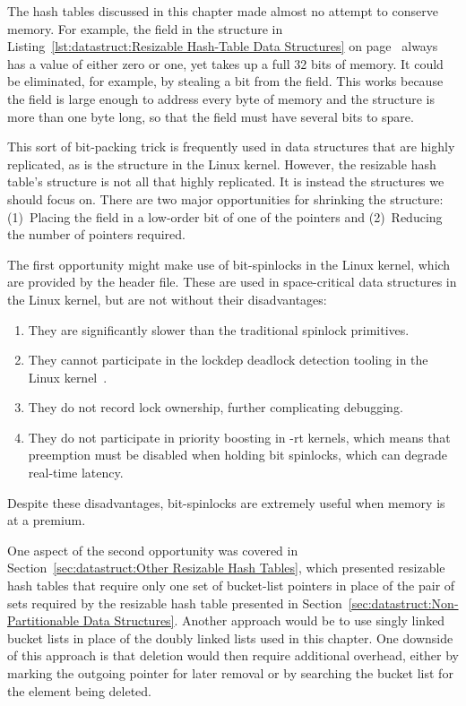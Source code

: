 The hash tables discussed in this chapter made almost no attempt to conserve
memory.
For example, the  field in the  structure in
Listing~\ref{lst:datastruct:Resizable Hash-Table Data Structures} on
page~\pageref{lst:datastruct:Resizable Hash-Table Data Structures}
always has a value of either zero or one, yet takes up a full 32 bits
of memory.
It could be eliminated, for example, by stealing a bit from the
 field.
This works because the  field is large enough to
address every byte of memory and the  structure
is more than one byte long, so that
the  field must have several bits to spare.

This sort of bit-packing trick is frequently used in data structures
that are highly replicated, as is the  structure in the Linux
kernel.
However, the resizable hash table's  structure is not all that
highly replicated.
It is instead the  structures we should focus on.
There are two major opportunities for shrinking the  structure:
(1)~Placing the  field in a low-order bit of one of the
 pointers and (2)~Reducing the number of pointers required.

The first opportunity might make use of bit-spinlocks in the Linux
kernel, which are provided by the 
header file.
These are used in space-critical data structures in the Linux kernel,
but are not without their disadvantages:

\begin{enumerate}
\item	They are significantly slower than the traditional spinlock
	primitives.
\item	They cannot participate in the lockdep deadlock detection
	tooling in the Linux kernel~\cite{JonathanCorbet2006lockdep}.
\item	They do not record lock ownership, further complicating
	debugging.
\item	They do not participate in priority boosting in -rt kernels,
	which means that preemption must be disabled when holding
	bit spinlocks, which can degrade real-time latency.
\end{enumerate}

Despite these disadvantages, bit-spinlocks are extremely useful when
memory is at a premium.

One aspect of the second opportunity was covered in
Section~\ref{sec:datastruct:Other Resizable Hash Tables},
which presented resizable hash tables that require only one
set of bucket-list pointers in place of the pair of sets required
by the resizable hash table presented in
Section~\ref{sec:datastruct:Non-Partitionable Data Structures}.
Another approach would be to use singly linked bucket lists in
place of the doubly linked lists used in this chapter.
One downside of this approach is that deletion would then require
additional overhead, either by marking the outgoing pointer
for later removal
or by searching the bucket list for the element being deleted.

